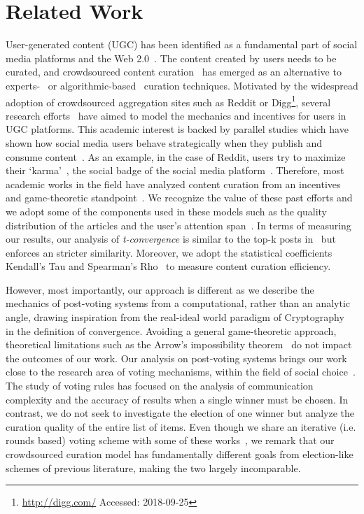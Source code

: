 \section{Related Work}
  User-generated content (UGC) has been identified as a fundamental part of social media platforms and the Web 2.0~\cite{kaplan2010users}. The content created by users needs to be curated, and crowdsourced content curation~\cite{askalidis2013theoretical} has emerged as an alternative to experts-~\cite{stanoevska2012content} or algorithmic-based~\cite{rader2015understanding} curation techniques. Motivated by the widespread adoption of crowdsourced aggregation sites such as Reddit or Digg\footnote{\url{http://digg.com/} Accessed: 2018-09-25}, several research efforts~\cite{das2010ranking,ghosh2011incentivizing} have aimed to model the mechanics and incentives for users in UGC platforms. This academic interest is backed by parallel studies which have shown how
social media users behave strategically when they publish and consume content~\cite{may2014filter}. As an example, in the case of Reddit, users try to maximize their `karma'~\cite{bergstrom2011don}, the social badge of the social media platform~\cite{anderson2013steering}.
   Therefore, most academic works in the field have analyzed content curation from an incentives and game-theoretic standpoint~\cite{ghosh2011incentivizing,das2010ranking,gupte2009news,may2014filter}. We recognize the value of these past efforts and we adopt some of the components used in these models such as the quality distribution of the articles and the user's attention span~\cite{askalidis2013theoretical,ghosh2011incentivizing}. In terms of measuring our results,  our analysis of \textit{t-convergence} is similar to the top-k posts in~\cite{askalidis2013theoretical} but enforces an stricter similarity. Moreover, we adopt the statistical coefficients Kendall's Tau and Spearman's Rho~\cite{xu2013comparative,yue2002power} to measure content curation efficiency.

    However, most importantly, our approach is different as we describe the mechanics of post-voting systems from a computational, rather than an analytic angle, drawing inspiration from the real-ideal world paradigm of Cryptography~\cite{lindell} in the definition of convergence. Avoiding a general game-theoretic approach, theoretical limitations such as the Arrow's impossibility theorem~\cite{arrow1950difficulty} do not impact the outcomes of our work.
    Our analysis on post-voting systems brings our work close to the research area of voting mechanisms, within the field of social choice~\cite{lu2011robust,conitzer2005communication,xia2010compilation}. The study of voting rules has focused on the analysis of communication complexity and the accuracy of results when a single winner must be chosen. In contrast, we do not seek to investigate the election of one winner but analyze the curation quality of the entire list of items. Even though we share an iterative (i.e. rounds based) voting scheme with some of these works~\cite{kalech2011practical}, we remark that our crowdsourced curation model has fundamentally different goals from election-like schemes of previous literature, making the two largely incomparable.

